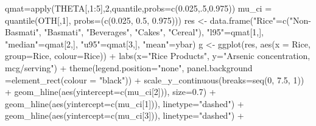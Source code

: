 \documentclass[]{article}
\newenvironment{Shaded}{\begin{snugshade}}{\end{snugshade}}
\newcommand{\KeywordTok}[1]{\textcolor[rgb]{0.94,0.87,0.69}{{#1}}}
\newcommand{\DataTypeTok}[1]{\textcolor[rgb]{0.87,0.87,0.75}{{#1}}}
\newcommand{\DecValTok}[1]{\textcolor[rgb]{0.86,0.86,0.80}{{#1}}}
\newcommand{\FloatTok}[1]{\textcolor[rgb]{0.75,0.75,0.82}{{#1}}}
\newcommand{\StringTok}[1]{\textcolor[rgb]{0.80,0.58,0.58}{{#1}}}
\newcommand{\NormalTok}[1]{\textcolor[rgb]{0.80,0.80,0.80}{{#1}}}
\begin{document}
\begin{Shaded}
\begin{Highlighting}[]
\NormalTok{qmat=}\KeywordTok{apply}\NormalTok{(THETA[,}\DecValTok{1}\NormalTok{:}\DecValTok{5}\NormalTok{],}\DecValTok{2}\NormalTok{,quantile,}\DataTypeTok{probs=}\KeywordTok{c}\NormalTok{(}\FloatTok{0.025}\NormalTok{,.}\DecValTok{5}\NormalTok{,}\FloatTok{0.975}\NormalTok{))}
\NormalTok{mu_ci =}\StringTok{ }\KeywordTok{quantile}\NormalTok{(OTH[,}\DecValTok{1}\NormalTok{], }\DataTypeTok{probs=}\NormalTok{(}\KeywordTok{c}\NormalTok{(}\FloatTok{0.025}\NormalTok{, }\FloatTok{0.5}\NormalTok{, }\FloatTok{0.975}\NormalTok{)))}
\NormalTok{res <-}\StringTok{ }\KeywordTok{data.frame}\NormalTok{(}\StringTok{"Rice"}\NormalTok{=}\KeywordTok{c}\NormalTok{(}\StringTok{"Non-Basmati"}\NormalTok{, }\StringTok{"Basmati"}\NormalTok{, }\StringTok{"Beverages"}\NormalTok{, }\StringTok{"Cakes"}\NormalTok{, }\StringTok{"Cereal"}\NormalTok{),}
                         \StringTok{"l95"}\NormalTok{=qmat[}\DecValTok{1}\NormalTok{,], }\StringTok{"median"}\NormalTok{=qmat[}\DecValTok{2}\NormalTok{,], }\StringTok{"u95"}\NormalTok{=qmat[}\DecValTok{3}\NormalTok{,], }\StringTok{"mean"}\NormalTok{=ybar)}
\NormalTok{g <-}\StringTok{ }\KeywordTok{ggplot}\NormalTok{(res, }\KeywordTok{aes}\NormalTok{(}\DataTypeTok{x =} \NormalTok{Rice, }\DataTypeTok{group=}\NormalTok{Rice, }\DataTypeTok{colour=}\NormalTok{Rice)) +}\StringTok{ }
\StringTok{  }\KeywordTok{labs}\NormalTok{(}\DataTypeTok{x=}\StringTok{"Rice Products"}\NormalTok{, }\DataTypeTok{y=}\StringTok{"Arsenic concentration, mcg/serving"}\NormalTok{) +}\StringTok{ }
\StringTok{  }\KeywordTok{theme}\NormalTok{(}\DataTypeTok{legend.position=}\StringTok{"none"}\NormalTok{, }\DataTypeTok{panel.background =}\KeywordTok{element_rect}\NormalTok{(}\DataTypeTok{colour =} \StringTok{"black"}\NormalTok{)) +}
\StringTok{  }\KeywordTok{scale_y_continuous}\NormalTok{(}\DataTypeTok{breaks=}\KeywordTok{seq}\NormalTok{(}\DecValTok{0}\NormalTok{, }\FloatTok{7.5}\NormalTok{, }\DecValTok{1}\NormalTok{)) +}
\StringTok{  }\KeywordTok{geom_hline}\NormalTok{(}\KeywordTok{aes}\NormalTok{(}\DataTypeTok{yintercept=}\KeywordTok{c}\NormalTok{(mu_ci[}\DecValTok{2}\NormalTok{])), }\DataTypeTok{size=}\FloatTok{0.7}\NormalTok{) +}
\StringTok{  }\KeywordTok{geom_hline}\NormalTok{(}\KeywordTok{aes}\NormalTok{(}\DataTypeTok{yintercept=}\KeywordTok{c}\NormalTok{(mu_ci[}\DecValTok{1}\NormalTok{])), }\DataTypeTok{linetype=}\StringTok{"dashed"}\NormalTok{) +}
\StringTok{  }\KeywordTok{geom_hline}\NormalTok{(}\KeywordTok{aes}\NormalTok{(}\DataTypeTok{yintercept=}\KeywordTok{c}\NormalTok{(mu_ci[}\DecValTok{3}\NormalTok{])), }\DataTypeTok{linetype=}\StringTok{"dashed"}\NormalTok{) +}

\end{Highlighting}
\end{Shaded}
\end{document}
